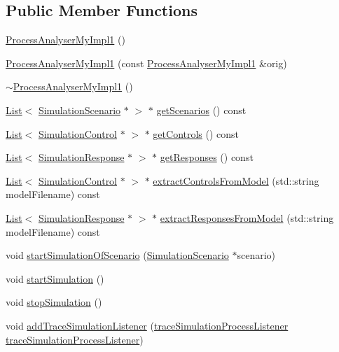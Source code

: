 \subsection*{Public Member Functions}
\begin{DoxyCompactItemize}
\item 
\hyperlink{class_process_analyser_my_impl1_ac71ae1beb3b827d4fad5429cc394e6e5}{Process\-Analyser\-My\-Impl1} ()
\item 
\hyperlink{class_process_analyser_my_impl1_a040744994793866b4843e66a726a6db0}{Process\-Analyser\-My\-Impl1} (const \hyperlink{class_process_analyser_my_impl1}{Process\-Analyser\-My\-Impl1} \&orig)
\item 
\hyperlink{class_process_analyser_my_impl1_a42185ce89f4c324e0f6adf3cb4b10aa4}{$\sim$\-Process\-Analyser\-My\-Impl1} ()
\item 
\hyperlink{class_list}{List}$<$ \hyperlink{class_simulation_scenario}{Simulation\-Scenario} $\ast$ $>$ $\ast$ \hyperlink{class_process_analyser_my_impl1_a17c3b2c84926e051d8152f257480debd}{get\-Scenarios} () const 
\item 
\hyperlink{class_list}{List}$<$ \hyperlink{class_simulation_control}{Simulation\-Control} $\ast$ $>$ $\ast$ \hyperlink{class_process_analyser_my_impl1_aece4a70c290157902dce0be02dd229ea}{get\-Controls} () const 
\item 
\hyperlink{class_list}{List}$<$ \hyperlink{class_simulation_response}{Simulation\-Response} $\ast$ $>$ $\ast$ \hyperlink{class_process_analyser_my_impl1_a5ceddb133d3740afb7a7e0aeafec0b47}{get\-Responses} () const 
\item 
\hyperlink{class_list}{List}$<$ \hyperlink{class_simulation_control}{Simulation\-Control} $\ast$ $>$ $\ast$ \hyperlink{class_process_analyser_my_impl1_a21cca0a0cc9831aa674f783968534a4c}{extract\-Controls\-From\-Model} (std\-::string model\-Filename) const 
\item 
\hyperlink{class_list}{List}$<$ \hyperlink{class_simulation_response}{Simulation\-Response} $\ast$ $>$ $\ast$ \hyperlink{class_process_analyser_my_impl1_adf4f53b5a01d17ca04159dae6f6e2c88}{extract\-Responses\-From\-Model} (std\-::string model\-Filename) const 
\item 
void \hyperlink{class_process_analyser_my_impl1_a597543c7676c46c7c47046205d3903f3}{start\-Simulation\-Of\-Scenario} (\hyperlink{class_simulation_scenario}{Simulation\-Scenario} $\ast$scenario)
\item 
void \hyperlink{class_process_analyser_my_impl1_a3b3092c3814aa31efc2c544d821812a2}{start\-Simulation} ()
\item 
void \hyperlink{class_process_analyser_my_impl1_a4db69ac95212f475cf014d68d1154a47}{stop\-Simulation} ()
\item 
void \hyperlink{class_process_analyser_my_impl1_a6089c0772184c64d9fec52e9a46dd0ee}{add\-Trace\-Simulation\-Listener} (\hyperlink{_listener_8h_a8f5a30615774c5ee0b5c5f86741e4b6f}{trace\-Simulation\-Process\-Listener} \hyperlink{_listener_8h_a8f5a30615774c5ee0b5c5f86741e4b6f}{trace\-Simulation\-Process\-Listener})
\end{DoxyCompactItemize}



